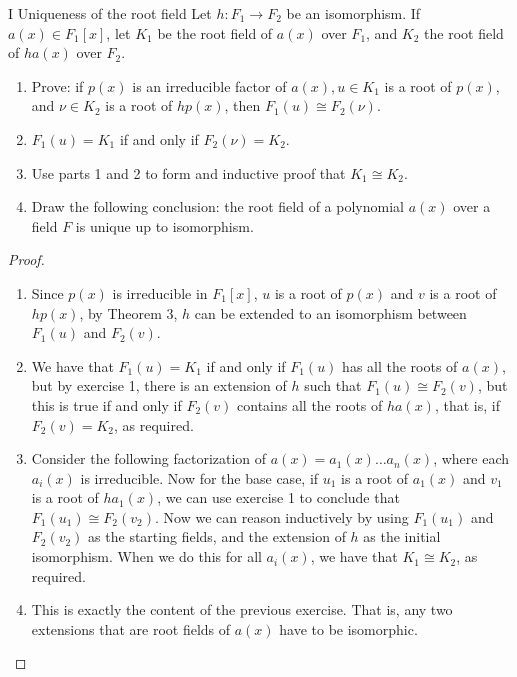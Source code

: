 \begin{exercise}{I Uniqueness of the root field}
Let $h:F_1\rightarrow F_2$ be an isomorphism. If $a(x)\in F_1[x]$, let $K_1$ be the root field of $a(x)$ over $F_1$, and $K_2$ the root field of $ha(x)$ over $F_2$.
\begin{enumerate}
    \item Prove: if $p(x)$ is an irreducible factor of $a(x),u\in K_1$ is a root of $p(x)$, and $\nu\in K_2$ is a root of $hp(x)$, then $F_1(u)\cong F_2(\nu)$.
    \item $F_1(u)=K_1$ if and only if $F_2(\nu)=K_2$.
    \item Use parts 1 and 2 to form and inductive proof that $K_1\cong K_2$.
    \item Draw the following conclusion: the root field of a polynomial $a(x)$ over a field $F$ is unique up to isomorphism.
\end{enumerate}
\end{exercise}
\begin{proof}
 \begin{enumerate}
     \item Since $p(x)$ is irreducible in $F_1[x]$, $u$ is a root of $p(x)$ and $v$ is a root of $hp(x)$, by Theorem 3, $h$ can be extended to an isomorphism between $F_1(u)$ and $F_2(v)$.
     \item We have that $F_1(u)=K_1$ if and only if $F_1(u)$ has all the roots of $a(x)$, but by exercise 1, there is an extension of $h$ such that $F_1(u)\cong F_2(v)$, but this is true if and only if $F_2(v)$ contains all the roots of $ha(x)$, that is, if $F_2(v)=K_2$, as required.
     \item Consider the following factorization of $a(x)=a_1(x)\dots a_n(x)$, where each $a_i(x)$ is irreducible. Now for the base case, if $u_1$ is a root of $a_1(x)$ and $v_1$ is a root of $ha_1(x)$, we can use exercise 1 to conclude that $F_1(u_1)\cong F_2(v_2)$. Now we can reason inductively by using $F_1(u_1)$ and $F_2(v_2)$ as the starting fields, and the extension of $h$ as the initial isomorphism. When we do this for all $a_i(x)$, we have that $K_1\cong K_2$, as required.
     \item This is exactly the content of the previous exercise. That is, any two extensions that are root fields of $a(x)$ have to be isomorphic.
 \end{enumerate}
\end{proof}

